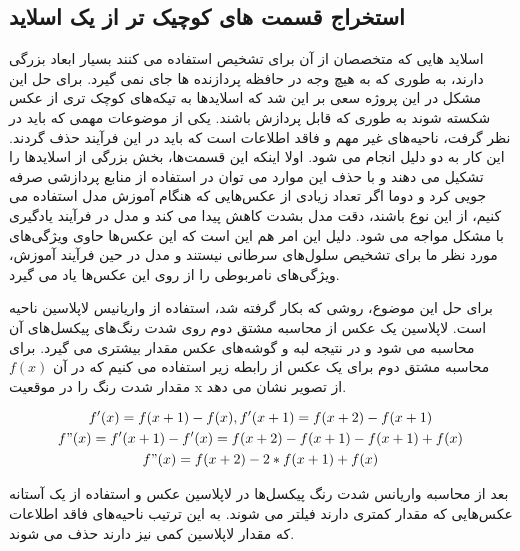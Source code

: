\subsection{استخراج قسمت های کوچیک تر از یک اسلاید}\label{subsec:استخراج-قسمت-های-کوچیک-تر-از-یک-اسلاید}

اسلاید هایی که متخصصان از آن برای تشخیص استفاده می کنند بسیار ابعاد بزرگی دارند، به طوری که به هیچ وجه در
حافظه پردازنده ها جای نمی گیرد.
برای حل این مشکل در این پروژه سعی بر این شد که اسلاید‌ها به تیکه‌های کوچک تری از عکس شکسته شوند به طوری که قابل پردازش باشند.
یکی از موضوعات مهمی که باید در نظر گرفت، ناحیه‌های غیر مهم و فاقد اطلاعات است که باید در این فرآیند حذف گردند. این کار به دو دلیل انجام می شود.
اولا اینکه این قسمت‌ها، بخش بزرگی از اسلاید‌ها را تشکیل می دهند و با حذف این موارد می توان در استفاده از منابع پردازشی صرفه جویی کرد
و دوما اگر تعداد زیادی از عکس‌هایی که هنگام آموزش مدل استفاده می کنیم، از این نوع باشند، دقت مدل بشدت کاهش پیدا می کند و مدل در فرآیند یادگیری با مشکل مواجه می شود.
دلیل این امر هم این است که این عکس‌ها حاوی ویژگی‌های مورد نظر ما برای تشخیص سلول‌های سرطانی نیستند و مدل در حین فرآیند آموزش، ویژگی‌های نامربوطی را از روی این عکس‌ها یاد می گیرد.

برای حل این موضوع، روشی که بکار گرفته شد، استفاده از واریانیس لاپلاسین ناحیه است.
لاپلاسین یک عکس از محاسبه مشتق دوم روی شدت رنگ‌های پیکسل‌های آن محاسبه می شود
و در نتیجه لبه و گوشه‌های عکس مقدار بیشتری می گیرد.
برای محاسبه مشتق دوم برای یک عکس از رابطه زیر استفاده می کنیم که در آن $f(x)$ مقدار شدت رنگ را در موقعیت x از تصویر نشان می دهد.

\begin{gather*}
    f'(x) = f(x+1) - f(x), f'(x+1) = f(x+2) - f(x+1)\\
    f"(x) = f'(x+1) - f'(x)= f(x+2) - f(x+1) - f(x+1) + f(x)\\
    f"(x) = f(x+2) - 2*f(x+1) + f(x)\\
\end{gather*}

بعد از محاسبه واریانس شدت رنگ پیکسل‌ها در لاپلاسین عکس و استفاده از یک آستانه عکس‌هایی که مقدار کمتری دارند فیلتر می شوند.
به این ترتیب ناحیه‌های فاقد اطلاعات که مقدار لاپلاسین کمی نیز دارند حذف می شوند.

